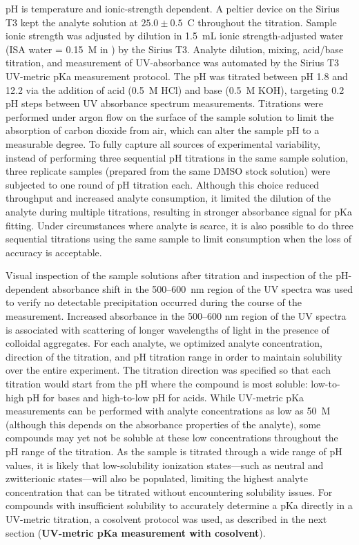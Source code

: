 \documentclass[9pt,lineno]{elife}
\begin{document}
pH is temperature and ionic-strength dependent. 
A peltier device on the Sirius T3 kept the analyte solution at $25.0 \pm 0.5$~\textdegree C throughout the titration. 
Sample ionic strength was adjusted by dilution in 1.5~mL ionic strength-adjusted water (ISA water = 0.15~M  in ) by the Sirius T3.  
Analyte dilution, mixing, acid/base titration, and measurement of UV-absorbance was automated by the Sirius T3 UV-metric pKa measurement protocol. 
The pH was titrated between pH 1.8 and 12.2 via the addition of acid (0.5~M HCl) and base (0.5~M KOH), targeting 0.2 pH steps between UV absorbance spectrum measurements. 
Titrations were performed under argon flow on the surface of the sample solution to limit the absorption of carbon dioxide from air, which can alter the sample pH to a measurable degree. 
To fully capture all sources of experimental variability, instead of performing three sequential pH titrations in the same sample solution, three replicate samples (prepared from the same DMSO stock solution) were subjected to one round of pH titration each. 
Although this choice reduced throughput and increased analyte consumption, it limited the dilution of the analyte during multiple titrations, resulting in stronger absorbance signal for pKa fitting. Under circumstances where analyte is scarce, it is also possible to do three sequential titrations using the same sample to limit consumption when the loss of accuracy is acceptable. 

Visual inspection of the sample solutions after titration and inspection of the pH-dependent absorbance shift in the 500--600~nm region of the UV spectra was used to verify no detectable precipitation occurred during the course of the measurement. 
Increased absorbance in the 500--600 nm region of the UV spectra is associated with scattering of longer wavelengths of light in the presence of colloidal aggregates. 
For each analyte, we optimized analyte concentration, direction of the titration, and pH titration range in order to maintain solubility over the entire experiment. 
The titration direction was specified so that each titration would start from the pH where the compound is most soluble: low-to-high pH for bases and high-to-low pH for acids. 
While UV-metric pKa measurements can be performed with analyte concentrations as low as 50~{\micro}M (although this depends on the absorbance properties of the analyte), some compounds may yet not be soluble at these low concentrations throughout the pH range of the titration. 
As the sample is titrated through a wide range of pH values, it is likely that low-solubility ionization states---such as neutral and zwitterionic states---will also be populated, limiting the highest analyte concentration that can be titrated without encountering solubility issues.  
For compounds with insufficient solubility to accurately determine a pKa directly in a UV-metric titration, a cosolvent protocol was used, as described in the next section ({\bf UV-metric pKa measurement with cosolvent}). 
\end{document}
